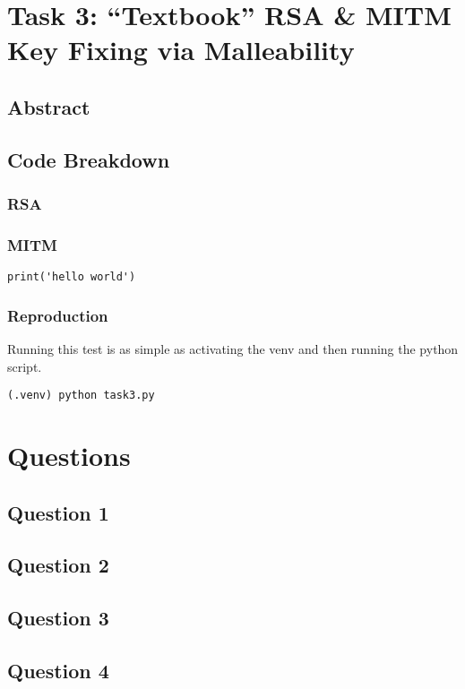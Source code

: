 \documentclass[11pt]{article}
\begin{document}
\section*{Task 3: ``Textbook'' RSA \& MITM Key Fixing via Malleability}
\subsection*{Abstract}

\subsection*{Code Breakdown}
\subsubsection*{RSA}
\subsubsection*{MITM}

\begin{lstlisting}
print('hello world')
\end{lstlisting}

\subsubsection*{Reproduction}

Running this test is as simple as activating the venv and then running the python script.

\verb|(.venv) python task3.py|

\section*{Questions}
\subsection*{Question 1}
\subsection*{Question 2}
\subsection*{Question 3}
\subsection*{Question 4}
\end{document}
